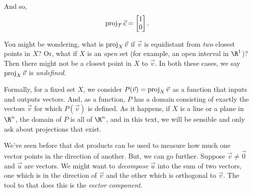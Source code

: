 \begin{example}
\begin{center}
\end{center}

	And so, 
	\[
		\Proj_{\mathcal T}\vec c =\mat{1\\0}.
	\]
\end{example}

You might be wondering, what is $\operatorname{proj}_X\vec v$ if $\vec v$ is equidistant from \emph{two}
closest points in $X$? Or, what if $X$ is an \emph{open} set (for example, an open interval in $\R^1$)?
Then there might not be a closest point in $X$ to $\vec v$. In both these cases, we say $\operatorname{proj}_X\vec v$
is \emph{undefined}.

Formally, for a fixed set $X$, we consider $P(\vec v)=\operatorname{proj}_X\vec v$ as a function that inputs and outputs
vectors. And, as a function, $P$ has a domain consisting of exactly the vectors $\vec v$ for which $P(\vec v)$
is defined. As it happens, if $X$ is a line or a plane in $\R^n$, the domain of $P$ is all of $\R^n$, and in this text,
we will be sensible and only ask about projections that exist. 


We've seen before that dot products can be used to measure how much one
vector points in the direction of another. But, we can go further. Suppose 
$\vec v\neq \vec 0$ and $\vec u$ are vectors. We might want to \emph{decompose}
$\vec u$ into the sum of two vectors, one which is in the direction of $\vec v$
and the other which is orthogonal to $\vec v$. The tool to that does this is the \emph{vector component}.

